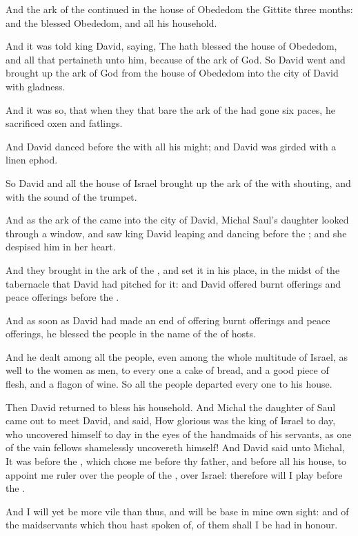 \Verse And the ark of the \LORD continued in the house of Obededom the Gittite three months: and the \LORD blessed Obededom, and all his household.

\Verse And it was told king David, saying, The \LORD hath blessed the house of Obededom, and all that pertaineth unto him, because of the ark of God. So David went and brought up the ark of God from the house of Obededom into the city of David with gladness.

\Verse And it was so, that when they that bare the ark of the \LORD had gone six paces, he sacrificed oxen and fatlings.

\Verse And David danced before the \LORD with all his might; and David was girded with a linen ephod.

\Verse So David and all the house of Israel brought up the ark of the \LORD with shouting, and with the sound of the trumpet.

\Verse And as the ark of the \LORD came into the city of David, Michal Saul's daughter looked through a window, and saw king David leaping and dancing before the \LORD; and she despised him in her heart.

\Verse And they brought in the ark of the \LORD, and set it in his place, in the midst of the tabernacle that David had pitched for it: and David offered burnt offerings and peace offerings before the \LORD.

\Verse And as soon as David had made an end of offering burnt offerings and peace offerings, he blessed the people in the name of the \LORD of hosts.

\Verse And he dealt among all the people, even among the whole multitude of Israel, as well to the women as men, to every one a cake of bread, and a good piece of flesh, and a flagon of wine. So all the people departed every one to his house.

\Verse Then David returned to bless his household. And Michal the daughter of Saul came out to meet David, and said, How glorious was the king of Israel to day, who uncovered himself to day in the eyes of the handmaids of his servants, as one of the vain fellows shamelessly uncovereth himself!  \Verse And David said unto Michal, It was before the \LORD, which chose me before thy father, and before all his house, to appoint me ruler over the people of the \LORD, over Israel: therefore will I play before the \LORD.

\Verse And I will yet be more vile than thus, and will be base in mine own sight: and of the maidservants which thou hast spoken of, of them shall I be had in honour.

